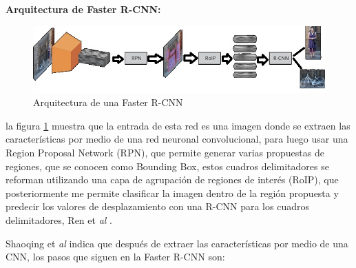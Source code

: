 \item \textbf{Arquitectura de Faster R-CNN:}\label{sec:Faster}

\begin{figure}[H]
    \centering
    \includegraphics[width=0.8\linewidth]{imagenes/Arquitectura_faster.jpg}
    \caption{Arquitectura de una Faster R-CNN}
    \label{fig:Arquitectura_Faster}
\end{figure}

la figura \ref{fig:Arquitectura_Faster} muestra que la entrada de esta red es una imagen donde se extraen las características por medio de una red neuronal convolucional, para luego usar una Region Proposal Network (RPN), que permite generar varias propuestas de regiones, que se conocen como Bounding Box, estos cuadros delimitadores se reforman utilizando una capa de agrupación de regiones de interés (RoIP), que posteriormente me permite clasificar la imagen dentro de la región propuesta y predecir los valores de desplazamiento con una R-CNN para los cuadros delimitadores, Ren et \textit{al} \cite{Ren_2017}.

Shaoqing et \textit{al} \cite{DBLP:journals/corr/RenHG015} indica que después de extraer las características por medio de una CNN, los pasos que siguen en la Faster R-CNN son:

